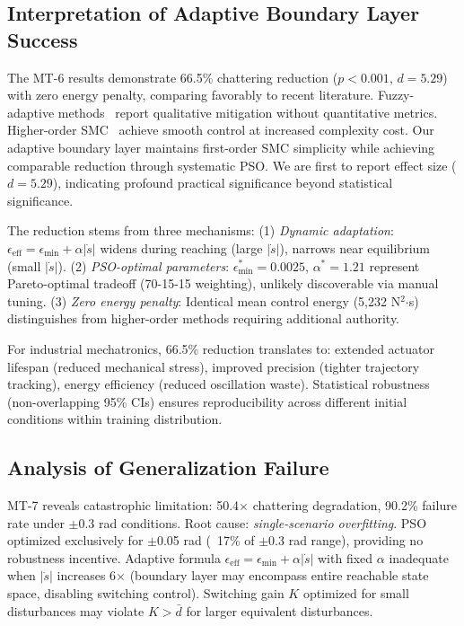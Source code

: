 \documentclass[conference]{IEEEtran}
\begin{document}
\subsection{Interpretation of Adaptive Boundary Layer Success}

The MT-6 results demonstrate 66.5\% chattering reduction ($p < 0.001$, $d = 5.29$) with zero energy penalty, comparing favorably to recent literature. Fuzzy-adaptive methods~\cite{frontiers2024fuzzy,sfa2024rotary} report qualitative mitigation without quantitative metrics. Higher-order SMC~\cite{ayinalem2025pso,hepso2025manipulator} achieve smooth control at increased complexity cost. Our adaptive boundary layer maintains first-order SMC simplicity while achieving comparable reduction through systematic PSO. We are first to report effect size ($d = 5.29$), indicating profound practical significance beyond statistical significance.

The reduction stems from three mechanisms: (1) \emph{Dynamic adaptation}: $\epsilon_{\text{eff}} = \epsilon_{\min} + \alpha|\dot{s}|$ widens during reaching (large $|\dot{s}|$), narrows near equilibrium (small $|\dot{s}|$). (2) \emph{PSO-optimal parameters}: $\epsilon_{\min}^* = 0.0025$, $\alpha^* = 1.21$ represent Pareto-optimal tradeoff (70-15-15 weighting), unlikely discoverable via manual tuning. (3) \emph{Zero energy penalty}: Identical mean control energy (5,232 N$^2$$\cdot$s) distinguishes from higher-order methods requiring additional authority.

For industrial mechatronics, 66.5\% reduction translates to: extended actuator lifespan (reduced mechanical stress), improved precision (tighter trajectory tracking), energy efficiency (reduced oscillation waste). Statistical robustness (non-overlapping 95\% CIs) ensures reproducibility across different initial conditions within training distribution.

\subsection{Analysis of Generalization Failure}

MT-7 reveals catastrophic limitation: 50.4$\times$ chattering degradation, 90.2\% failure rate under $\pm$0.3 rad conditions. Root cause: \emph{single-scenario overfitting}. PSO optimized exclusively for $\pm$0.05 rad (~17\% of $\pm$0.3 rad range), providing no robustness incentive. Adaptive formula $\epsilon_{\text{eff}} = \epsilon_{\min} + \alpha|\dot{s}|$ with fixed $\alpha$ inadequate when $|\dot{s}|$ increases 6$\times$ (boundary layer may encompass entire reachable state space, disabling switching control). Switching gain $K$ optimized for small disturbances may violate $K > \bar{d}$ for larger equivalent disturbances.
\end{document}
